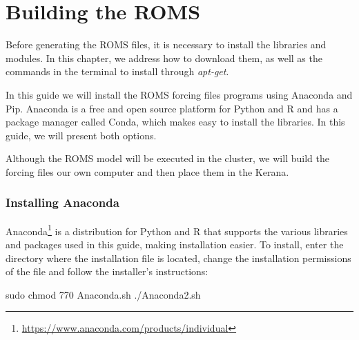\chapter{Building the ROMS}
\bigskip

Before generating the ROMS files, it is necessary to install the libraries and modules. 
In this chapter, we address how to download them, as well as the commands in the terminal to install through \textit{apt-get}.
\bigskip

In this guide we will install the ROMS forcing files programs using Anaconda and Pip. 
Anaconda is a free and open source platform for Python and R and has a package manager called Conda, which makes easy 
to install the libraries. In this guide, we will present both options. 
\bigskip

\begin{tcolorbox}[enhanced,
  grow to left by   = 0cm,
  grow to right by  = 0cm,
  enlarge top by    = 0cm,
  enlarge bottom by = 0cm,
  tcbox raise base,
  boxrule           = 1.0pt,
  left              = 18mm,
  colframe          = red!50!black,coltext=red!25!black,colback=red!10!white,
  overlay           = {\begin{tcbclipinterior}\fill[red!75!blue!50!white] (frame.south west)
    rectangle node[text=white,font=\sffamily\bfseries\footnotesize,rotate=0] {WARNING} ([xshift=18mm]frame.north west);\end{tcbclipinterior}}]
Although the ROMS model will be executed in the cluster, we will build the forcing files our own computer and then place them in the Kerana.
\end{tcolorbox}
\bigskip

\subsection{Installing Anaconda}\label{condasec}
\bigskip
Anaconda\textcolor{bleu_cite}{\textit{}\footnote{\textcolor{bleu_cite}{\href{https://www.anaconda.com/products/individual}{https://www.anaconda.com/products/individual}}}}
is a distribution for Python and R that supports the various libraries and packages used in this guide, 
making installation easier. To install, enter the directory where the installation file is located, change the installation permissions of the file and 
follow the installer's instructions:
\bigskip

\begin{bashcode}
 sudo chmod 770 Anaconda.sh
 ./Anaconda2.sh
\end{bashcode}
\bigskip

